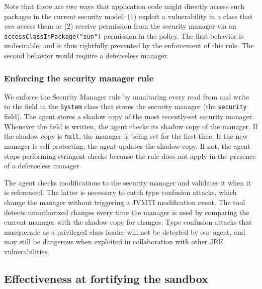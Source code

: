 \documentclass{sig-alternate-05-2015}
\begin{document}
Note that there are two ways that application code might directly access such
packages in the current security model: 
(1) exploit a vulnerability in a class that \emph{can} access them or (2)
receive permission from the security manager via an
\texttt{accessClassInPackage("sun")} permission in the policy.  The first behavior
is undesirable, and is thus rightfully prevented by the enforcement of this
rule.  The second behavior would require a defenseless manager. 


\subsubsection{Enforcing the security manager rule}\label{sub:Enforcing-the-SecurityManager}

We enforce the Security Manager rule by monitoring every read from
and write to the field in the \texttt{System} class that stores the security
manager (the \texttt{security} field).
%
The agent stores a shadow copy of the most recently-set security
manager.
Whenever the field is written, the agent checks its
shadow copy of the manager.  If the shadow copy is \texttt{null},
the manager is being set for the first time.  If the 
new manager is self-protecting,
the agent updates the shadow copy. If not, the agent stops performing stringent
checks because the rule does not apply in the presence of a defenseless 
manager.

The agent checks modifications to the security manager and validates it
when it is referenced.  The latter is necessary to
catch type confusion attacks, which 
change the manager without triggering a JVMTI modification event. 
The tool detects unauthorized changes every time the manager is 
used by comparing the current manager with the shadow copy for changes.
Type confusion attacks that masquerade as a privileged class loader 
will not be detected by our agent, and may still be dangerous when 
exploited in collaboration with other JRE vulnerabilities.

\subsection{Effectiveness at fortifying the sandbox}
\label{sub:Effectiveness-at-Fortifying}

\end{document}
